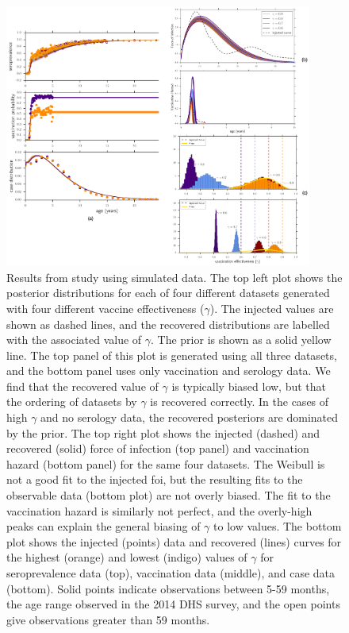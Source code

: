\documentclass[nofootinbib,aps,pre,twocolumn,superscriptaddress,showkeys,showpacs]{revtex4-1}
\begin{document}
\begin{figure}
\includegraphics[width=0.9\textwidth,angle=0]{figures/SimPlots-crop.pdf}
\caption{\label{fig:simplots} Results from study using simulated data. 
The top left plot shows the posterior distributions for each of four different datasets generated with four different vaccine effectiveness ($\gamma$). The injected values are shown as dashed lines, and the recovered distributions are labelled with the associated value of $\gamma$. The prior is shown as a solid yellow line. The top panel of this plot is generated using all three datasets, and the bottom panel uses only vaccination and serology data. We find that the recovered value of $\gamma$ is typically biased low, but that the ordering of datasets by $\gamma$ is recovered correctly. In the cases of high $\gamma$ and no serology data, the recovered posteriors are dominated by the prior.
The top right plot shows the injected (dashed) and recovered (solid) force of infection (top panel) and vaccination hazard (bottom panel) for the same four datasets. The Weibull is not a good fit to the injected foi, but the resulting fits to the observable data (bottom plot) are not overly biased. The fit to the vaccination hazard is similarly not perfect, and the overly-high peaks can explain the general biasing of $\gamma$ to low values. 
The bottom plot shows the injected (points) data and recovered (lines) curves for the highest (orange) and lowest (indigo) values of $\gamma$ for seroprevalence data (top), vaccination data (middle), and case data (bottom). Solid points indicate observations between 5-59 months, the age range observed in the 2014 DHS survey, and the open points give observations greater than 59 months. }
\end{figure}
\end{document}
